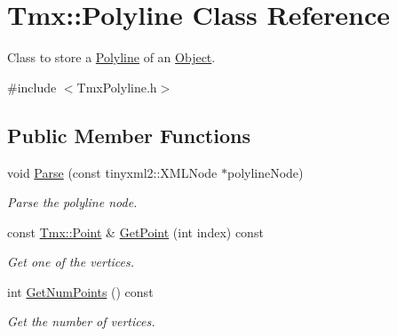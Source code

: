 \hypertarget{classTmx_1_1Polyline}{\section{Tmx\-:\-:Polyline Class Reference}
\label{classTmx_1_1Polyline}
}


Class to store a \hyperlink{classTmx_1_1Polyline}{Polyline} of an \hyperlink{classTmx_1_1Object}{Object}.  




{\ttfamily \#include $<$Tmx\-Polyline.\-h$>$}

\subsection*{Public Member Functions}
\begin{DoxyCompactItemize}
\item 
\hypertarget{classTmx_1_1Polyline_a6accc5ff77af04b4e3e0a70b1bcecaff}{void \hyperlink{classTmx_1_1Polyline_a6accc5ff77af04b4e3e0a70b1bcecaff}{Parse} (const tinyxml2\-::\-X\-M\-L\-Node $\ast$polyline\-Node)}\label{classTmx_1_1Polyline_a6accc5ff77af04b4e3e0a70b1bcecaff}

\begin{DoxyCompactList}\small\item\em Parse the polyline node. \end{DoxyCompactList}\item 
\hypertarget{classTmx_1_1Polyline_a1ec179549019163c7803e959cc6506b6}{const \hyperlink{structTmx_1_1Point}{Tmx\-::\-Point} \& \hyperlink{classTmx_1_1Polyline_a1ec179549019163c7803e959cc6506b6}{Get\-Point} (int index) const }\label{classTmx_1_1Polyline_a1ec179549019163c7803e959cc6506b6}

\begin{DoxyCompactList}\small\item\em Get one of the vertices. \end{DoxyCompactList}\item 
\hypertarget{classTmx_1_1Polyline_a7df0a235f803247a9c756cd3793adfbb}{int \hyperlink{classTmx_1_1Polyline_a7df0a235f803247a9c756cd3793adfbb}{Get\-Num\-Points} () const }\label{classTmx_1_1Polyline_a7df0a235f803247a9c756cd3793adfbb}

\begin{DoxyCompactList}\small\item\em Get the number of vertices. \end{DoxyCompactList}\end{DoxyCompactItemize}


